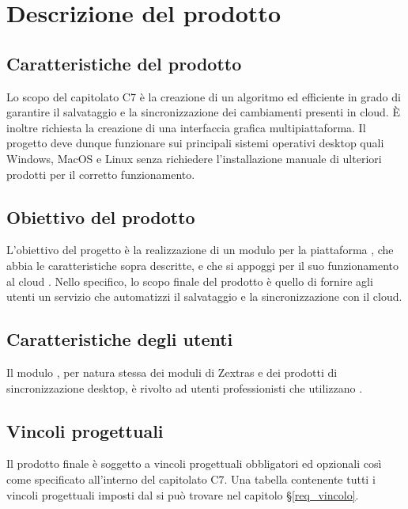 \section{Descrizione del prodotto}
\subsection{Caratteristiche del prodotto}
Lo scopo del capitolato C7 è la creazione di un algoritmo  ed efficiente in grado di garantire il salvataggio e la sincronizzazione dei cambiamenti presenti in cloud. È inoltre richiesta la creazione di una interfaccia grafica multipiattaforma. Il progetto deve dunque funzionare sui principali sistemi operativi desktop quali Windows, MacOS e Linux senza richiedere l'installazione manuale di ulteriori prodotti per il corretto funzionamento. 
\subsection{Obiettivo del prodotto}
L'obiettivo del progetto è la realizzazione di un modulo per la piattaforma , che abbia le caratteristiche sopra descritte, e che si appoggi per il suo funzionamento al cloud .
Nello specifico, lo scopo finale del prodotto è quello di fornire agli utenti un servizio che automatizzi il salvataggio e la sincronizzazione con il cloud.
\subsection{Caratteristiche degli utenti}
Il modulo \progetto{}, per natura stessa dei moduli di Zextras e dei prodotti di sincronizzazione desktop, è rivolto ad utenti professionisti che utilizzano . 
\subsection{Vincoli progettuali}
Il prodotto  finale è soggetto a vincoli progettuali obbligatori ed opzionali così come specificato all'interno del capitolato C7.
Una tabella contenente tutti i vincoli progettuali imposti dal  si può trovare nel capitolo \S{}\ref{req_vincolo}.